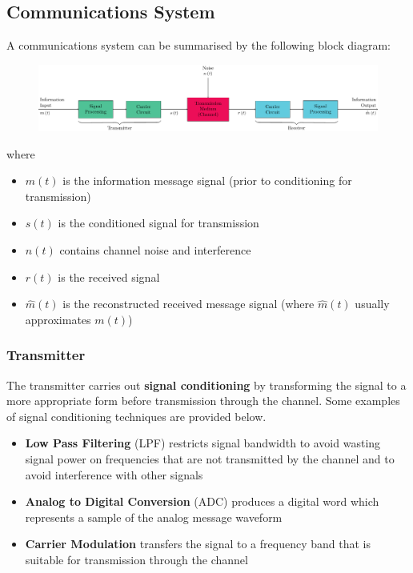 \documentclass{article}
\begin{document}
\subsection{Communications System}
A communications system can be summarised by the following block
diagram:
\begin{figure}[H]
    \centering
    \includegraphics[width=\linewidth]{figures/communications_system.pdf}
\end{figure}
where
\begin{itemize}
    \item \(m\left( t \right)\) is the information message signal
          (prior to conditioning for transmission)
    \item \(s\left( t \right)\) is the conditioned signal for transmission
    \item \(n\left( t \right)\) contains channel noise and interference
    \item \(r\left( t \right)\) is the received signal
    \item \(\hat{m}\left( t \right)\) is the reconstructed received
          message signal (where \(\hat{m}\left( t \right)\) usually
          approximates \(m\left( t \right)\))
\end{itemize}
\subsubsection{Transmitter}
The transmitter carries out \textbf{signal conditioning} by
transforming the signal to a more appropriate form before transmission
through the channel. Some examples of signal conditioning techniques
are provided below.
\begin{itemize}
    \item \textbf{Low Pass Filtering} (LPF) restricts signal bandwidth
          to avoid wasting signal power on frequencies that are not
          transmitted by the channel and to avoid interference with other
          signals
    \item \textbf{Analog to Digital Conversion} (ADC) produces a
          digital word which represents a sample of the analog message
          waveform
    \item \textbf{Carrier Modulation} transfers the signal to a
          frequency band that is suitable for transmission through the
          channel
\end{itemize}
\end{document}
